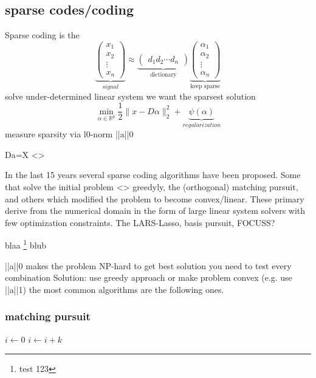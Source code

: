 \subsection{sparse codes/coding }
Sparse coding is the 
\[
\underbrace{\begin{pmatrix} x_1 \\ x_2 \\ \vdots \\ x_n \end{pmatrix}}_{signal} \approx \underbrace{\begin{pmatrix} d_1  d_2 \cdots d_n \end{pmatrix}}_{\textrm{dictionary}}
\underbrace{\begin{pmatrix} \alpha_1 \\ \alpha_2 \\ \vdots \\ \alpha_n \end{pmatrix}}_{\textrm{keep sparse}}
\]
solve under-determined linear system
we want the sparsest solution
\[
\min_{\alpha\in\mathbb{R}^{p}} \frac{1}{2} \lVert x - D\alpha \rVert^{2}_{2} + \underbrace{\psi(\alpha)}_{regularization}
\] 
measure sparsity via       l0-norm       ||a||0

Da=X
<>

In the last 15 years several sparse coding algorithms have been proposed. 
Some that solve the initial problem <> greedyly, the (orthogonal) matching pursuit, and others which modified the problem to become convex/linear. These primary derive from the numerical domain in the form of 
large linear system solvers with few optimization constraints. The LARS-Lasso, basis pursuit, FOCUSS?


blaa \footnote{test 123} blub

||a||0 makes the problem NP-hard
to get best solution you need to test every combination
Solution:
use greedy approach or make problem convex (e.g. use ||a||1)
the most common algorithms are the following ones.

\subsubsection{matching pursuit}
\begin{algorithmic}
        \STATE $i\gets 0$
\ELSE
                \STATE $i\gets i+k$
        \ENDIF
\ENDIF 
\end{algorithmic}

